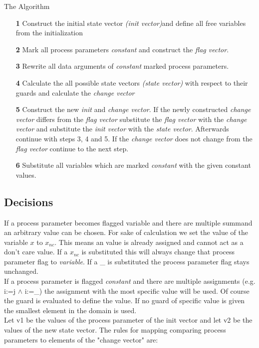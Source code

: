 \documentclass[a4paper,9pt]{article}
\begin{document}
The Algorithm
\begin{enumerate}
\item[\textbf{1}] Construct the initial state vector \textit{(init vector)}and define all free variables from the initialization
\item[\textbf{2}] Mark all process parameters \textit{constant} and construct the \textit{flag vector}.
\item[\textbf{3}] Rewrite all data arguments of \textit{constant} marked process parameters.
\item[\textbf{4}] Calculate the all possible state vectors \textit{(state vector)} with respect to their guards and calculate the \textit{change vector}
\item[\textbf{5}] Construct the new \textit{init} and \textit{change vector}. If the newly constructed \textit{change vector} differs from the \textit{flag vector} substitute the \textit{flag vector} with the \textit{change vector} and substitute the \textit{init vector} with the \textit{state vector}. Afterwards continue with steps 3, 4 and 5. If the \textit{change vector} does not change from the \textit{flag vector} continue to the next step.
\item[\textbf{6}] Substitute all variables which are marked \textit{constant} with the given constant values.
\end{enumerate}

\subsection{Decisions}
If a process parameter becomes flagged variable and there are multiple summand an arbitrary value can be chosen. For sake of calculation we set the value of the variable $x$ to $x_{nc}$. This means an value is already assigned and cannot act as a don't care value. If a $x_{nc}$ is substituted this will always change that process parameter flag to \textit{variable}. If a \_ is substituted the process parameter flag stays unchanged. \\ 
If a process parameter is flagged \textit{constant} and there are multiple assignments (e.g. i:=j $\wedge$ i:=\_) the assignment with the most specific value will be used. Of course the guard is evaluated to define the value. If no guard of specific value is given the smallest element in the domain is used. \\
Let v1 be the values of the process parameter of the init vector and let v2 be the values of the new state vector. The rules for mapping comparing process parameters to elements of the "change vector" are:
\end{document}

